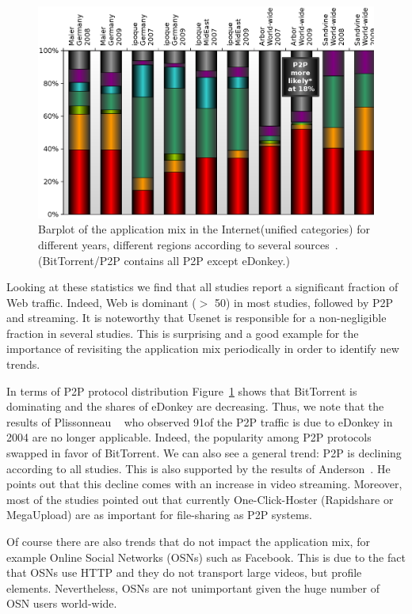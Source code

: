 \begin{figure}[tbp]
\centering
\includegraphics[width=0.95\linewidth]{figures/appmix.eps}
\renewcommand{\capname}{Barplot of the application mix in the
Internet\xspace}
\caption[\capname]{\capname (unified categories) for different years,
different regions according to several
sources~\cite{OnDominantCharacteristics2009,ipoque09,arbor,sandvine}.
\capcomment (BitTorrent/P2P contains all P2P except eDonkey.)}
\label{fig:related:appmix}
\end{figure}

Looking at these statistics we find that all studies report a significant
fraction of Web traffic. Indeed, Web is dominant ($>$ 50\perc) in most studies,
followed by P2P and streaming. It is noteworthy that Usenet is responsible for
a non-negligible fraction in several studies. This is surprising and a good
example for the importance of revisiting the application mix periodically in
order to identify new trends.

In terms of P2P protocol distribution Figure~\ref{fig:related:appmix} shows
that BitTorrent is dominating and the shares of eDonkey are decreasing.  Thus,
we note that the results of Plissonneau \etal~\cite{plissonneau05} who observed
91\perc of the P2P traffic is due to eDonkey in 2004 are no longer applicable.
Indeed, the popularity among P2P protocols swapped in favor of BitTorrent. We
can also see a general trend: P2P is declining according to all studies. This
is also supported by the results of Anderson~\cite{p2pdrops}. He points out
that this decline comes with an increase in video streaming. Moreover, most of
the studies pointed out that currently One-Click-Hoster (\eg Rapidshare or
MegaUpload) are as important for file-sharing as P2P systems.

Of course there are also trends that do not impact the application mix, for
example Online Social Networks (OSNs) such as Facebook. This is due to the fact
that OSNs use HTTP and they do not transport large videos, but profile
elements. Nevertheless, OSNs are not unimportant given the huge number of OSN
users world-wide.



